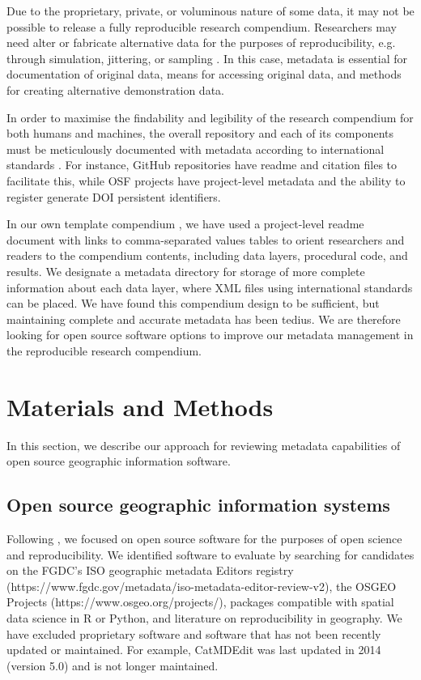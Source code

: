 \documentclass{isprs} %
\begin{document}
Due to the proprietary, private, or voluminous nature of some data, it may not be possible to release a fully reproducible research compendium.
Researchers may need alter or fabricate alternative data for the purposes of reproducibility, e.g. through simulation, jittering, or sampling \citep{Tullis2021,Singleton2016}. 
In this case, metadata is essential for documentation of original data, means for accessing original data, and methods for creating alternative demonstration data.

In order to maximise the findability and legibility of the research compendium for both humans and machines, the overall repository and each of its components must be meticulously documented with metadata according to international standards \citep{Wilkinson2016,Wilson2021}.
For instance, GitHub repositories have readme and citation files to facilitate this, while OSF projects have project-level metadata and the ability to register generate DOI persistent identifiers.

In our own template compendium \citep{Kedron_Holler_2022}, we have used a project-level readme document with links to comma-separated values tables to orient researchers and readers to the compendium contents, including data layers, procedural code, and results.
We designate a metadata directory for storage of more complete information about each data layer, where XML files using international standards can be placed.
We have found this compendium design to be sufficient, but maintaining complete and accurate metadata has been tedius.
We are therefore looking for open source software options to improve our metadata management in the reproducible research compendium.

\section{Materials and Methods}\label{methods}

In this section, we describe our approach for reviewing metadata capabilities of open source geographic information software.

\subsection{Open source geographic information systems}\label{software}

Following \citet{Singleton2016}, we focused on open source software for the purposes of open science and reproducibility.
We identified software to evaluate by searching for candidates on the FGDC's ISO geographic metadata Editors registry (https://www.fgdc.gov/metadata/iso-metadata-editor-review-v2), the OSGEO Projects (https://www.osgeo.org/projects/), packages compatible with spatial data science in R or Python, and literature on reproducibility in geography.
We have excluded proprietary software and software that has not been recently updated or maintained. 
For example, CatMDEdit was last updated in 2014 (version 5.0) and is not longer maintained. 
\end{document}
